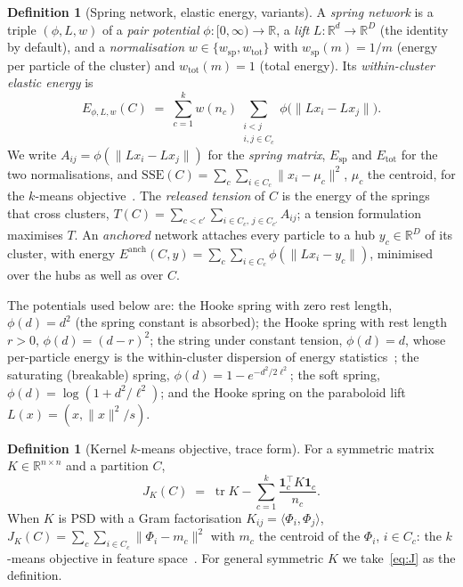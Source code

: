 \documentclass[11pt,a4paper]{article}
\theoremstyle{plain}
\theoremstyle{definition}
\newtheorem{definition}[theorem]{Definition}
\theoremstyle{remark}
\newcommand{\R}{\mathbb{R}}
\newcommand{\tr}{\operatorname{tr}}
\newcommand{\SSE}{\mathrm{SSE}}
\newcommand{\spec}{\mathrm{sp}}
\newcommand{\tot}{\mathrm{tot}}
\newcommand{\one}{\mathbf 1}
\begin{document}
\begin{definition}[Spring network, elastic energy, variants]\label{def:family}
A \emph{spring network} is a triple $(\phi,L,w)$ of a \emph{pair potential} $\phi\colon[0,\infty)\to\R$, a \emph{lift} $L\colon\R^d\to\R^D$ (the identity by default), and a \emph{normalisation} $w\in\{w_\spec,w_\tot\}$ with $w_\spec(m)=1/m$ (energy per particle of the cluster) and $w_\tot(m)=1$ (total energy). Its \emph{within-cluster elastic energy} is
\begin{equation}\label{eq:E}
E_{\phi,L,w}(C)\;=\;\sum_{c=1}^k w(n_c)\sum_{\substack{i<j\\ i,j\in C_c}}\phi\bigl(\lVert L x_i-L x_j\rVert\bigr).
\end{equation}
We write $A_{ij}=\phi(\lVert Lx_i-Lx_j\rVert)$ for the \emph{spring matrix}, $E_\spec$ and $E_\tot$ for the two normalisations, and $\SSE(C)=\sum_c\sum_{i\in C_c}\lVert x_i-\mu_c\rVert^2$, $\mu_c$ the centroid, for the $k$-means objective~\citep{macqueen1967,lloyd1982}. The \emph{released tension} of $C$ is the energy of the springs that cross clusters, $T(C)=\sum_{c<c'}\sum_{i\in C_c,\,j\in C_{c'}}A_{ij}$; a tension formulation maximises $T$. An \emph{anchored} network attaches every particle to a hub $y_c\in\R^D$ of its cluster, with energy $E^{\mathrm{anch}}(C,y)=\sum_c\sum_{i\in C_c}\phi(\lVert Lx_i-y_c\rVert)$, minimised over the hubs as well as over $C$.
\end{definition}

The potentials used below are: the Hooke spring with zero rest length, $\phi(d)=d^2$ (the spring constant is absorbed); the Hooke spring with rest length $r>0$, $\phi(d)=(d-r)^2$; the string under constant tension, $\phi(d)=d$, whose per-particle energy is the within-cluster dispersion of energy statistics~\citep{franca2021}; the saturating (breakable) spring, $\phi(d)=1-e^{-d^2/2\ell^2}$; the soft spring, $\phi(d)=\log(1+d^2/\ell^2)$; and the Hooke spring on the paraboloid lift $L(x)=(x,\lVert x\rVert^2/s)$.

\begin{definition}[Kernel $k$-means objective, trace form]\label{def:kkm}
For a symmetric matrix $K\in\R^{n\times n}$ and a partition $C$,
\begin{equation}\label{eq:J}
J_K(C)\;=\;\tr K-\sum_{c=1}^k\frac{\one_c^{\!\top}K\one_c}{n_c}.
\end{equation}
When $K$ is PSD with a Gram factorisation $K_{ij}=\langle\Phi_i,\Phi_j\rangle$, $J_K(C)=\sum_c\sum_{i\in C_c}\lVert\Phi_i-m_c\rVert^2$ with $m_c$ the centroid of the $\Phi_i$, $i\in C_c$: the $k$-means objective in feature space~\citep{scholkopf1998,girolami2002,zha2001,dhillon2004}. For general symmetric $K$ we take~\eqref{eq:J} as the definition.
\end{definition}
\end{document}
